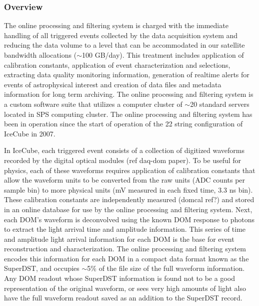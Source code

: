 \subsubsection{Overview}

The online processing and filtering system is charged with the immediate handling of all triggered events collected by the data
acquisition system and reducing the data volume to a level that can be
accommodated in our satellite bandwidth allocations ($\sim$100 GB/day).
This treatment includes application of calibration constants, application of event characterization and selections,  
extracting data quality monitoring information, generation of realtime alerts for events of astrophysical interest
and creation of data files and metadata information for long term archiving.  The online processing and filtering system
is a custom software suite that utilizes a computer cluster of $\sim$20 standard servers located in SPS computing cluster.
The online processing and filtering system has been in operation since the
start of operation of the 22 string configuration of IceCube in 2007.

In IceCube, each triggered event consists of a collection of digitized waveforms recorded by the digital optical modules (ref daq-dom paper).
To be useful for physics, each of these waveforms requires application of calibration constants that allow the waveform units
to be converted from the raw units (ADC counts per sample bin) to more physical units (mV measured in each fixed time, 3.3 ns bin).  These
calibration constants are independently measured (domcal ref?) and stored in an online database for use by
the online processing and filtering system.  Next, each DOM's waveform is deconvolved using the known DOM response
to photons to extract the light arrival time and amplitude information.  This series of time and amplitude light arrival information
for each DOM is the base for event reconstruction and characterization.  The online processing and filtering system encodes
this information for each DOM in a compact data format known as the SuperDST, and occupies $\sim$5\%  of the file size
of the full waveform information.  Any DOM readout whose SuperDST information is found not to be a good representation of the
original waveform, or sees very high amounts of light also have the full waveform readout saved as an addition to the SuperDST record.

